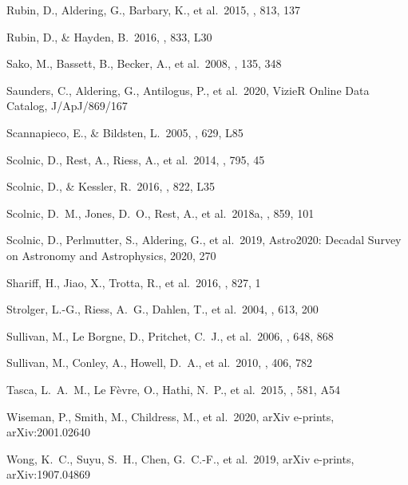 \documentclass[]{aa}
\begin{document}
\begin{thebibliography}{}
 Rubin, D., Aldering, G., Barbary, K., et
al.\ 2015, \apj, 813, 137

 Rubin, D., \& Hayden, B.\ 2016,
\apjl, 833, L30


 Sako, M., Bassett, B., Becker, A., et al.\
2008, \aj, 135, 348

 Saunders, C., Aldering, G.,
Antilogus, P., et al.\ 2020, VizieR Online Data Catalog, J/ApJ/869/167

 Scannapieco, E., \&
Bildsten, L.\ 2005, \apjl, 629, L85 

 Scolnic, D., Rest, A., Riess, A., et
al.\ 2014, \apj, 795, 45

 Scolnic, D., \& Kessler, R.\
2016, \apjl, 822, L35

 Scolnic, D.~M., Jones, D.~O., Rest,
A., et al.\ 2018a, \apj, 859, 101

 Scolnic, D., Perlmutter, S.,
Aldering, G., et al.\ 2019, Astro2020: Decadal Survey on Astronomy and
Astrophysics, 2020, 270

 Shariff, H., Jiao, X., Trotta, R.,
et al.\ 2016, \apj, 827, 1

 Strolger, L.-G., Riess, A.~G.,
Dahlen, T., et al.\ 2004, \apj, 613, 200

 Sullivan, M., Le Borgne, D.,
Pritchet, C.~J., et al.\ 2006, \apj, 648, 868 

 Sullivan, M., Conley, A., Howell,
D.~A., et al.\ 2010, \mnras, 406, 782


 Tasca, L.~A.~M., Le F{\`e}vre, O.,
Hathi, N.~P., et al.\ 2015, \aap, 581, A54


 Wiseman, P., Smith, M., Childress,
M., et al.\ 2020, arXiv e-prints, arXiv:2001.02640

 Wong, K.~C., Suyu, S.~H., Chen, G.~C.-F.,
et al.\ 2019, arXiv e-prints, arXiv:1907.04869

\end{thebibliography}
\end{document}
